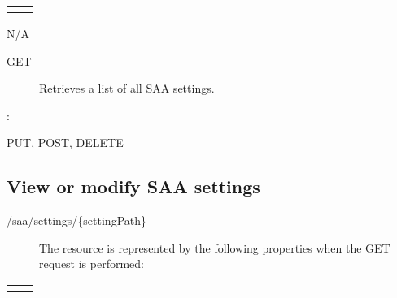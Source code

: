 \documentclass[letterpaper,10pt,english]{sphinxmanual}
\begin{document}
\begin{savenotes}\sphinxattablestart
\centering
\begin{tabulary}{\linewidth}[t]{|T|T|}
\hline

&
\\
\hline&\\
\hline
\end{tabulary}
\par
\sphinxattableend\end{savenotes}

 N/A
\begin{description}
\item[{ GET}] \leavevmode
Retrieves a list of all SAA settings.

\end{description}

:

\begin{sphinxVerbatim}[commandchars=\\\{\}]
\end{sphinxVerbatim}

 PUT, POST, DELETE


\subsection{View or modify SAA settings}
\label{\detokenize{restapi:view-or-modify-saa-settings}}
 /saa/settings/\{settingPath\}
\begin{description}
\item[{}] \leavevmode
The resource is represented by the following properties when the GET request is performed:

\end{description}


\begin{savenotes}\sphinxattablestart
\centering
\begin{tabulary}{\linewidth}[t]{|T|T|}
\hline

&
\\
\hline&\\
\hline
\end{tabulary}
\par
\sphinxattableend\end{savenotes}
\end{document}
